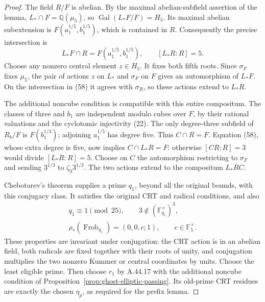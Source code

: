 \begin{proof}
The field \(R/F\) is abelian. By the maximal
abelian-subfield assertion of the lemma,
\(L_*\cap F=\mathbb Q(\mu_5)\), so
\(\operatorname{Gal}(L_*F/F)=H_5\).
Its maximal abelian subextension is
\(F(a_1^{1/5},b_1^{1/5})\), which is contained
in \(R\). Consequently the precise intersection is
\[
 L_*F\cap R=F(a_1^{1/5},b_1^{1/5}),\qquad
                        [L_*R:R]=5.                 \tag{58}
\]
Choose any nonzero central element \(z\in H_5\).
It fixes both fifth roots. Since \(\sigma_F\)
fixes \(\mu_5\), the pair of actions \(z\) on
\(L_*\) and \(\sigma_F\) on \(F\) gives an
automorphism of \(L_*F\). On the intersection
in (58) it agrees with \(\sigma_R\), so these
actions extend to \(L_*R\).

The additional noncube condition is compatible with
this entire compositum. The classes of three and
\(b_1\) are independent modulo cubes over \(F\),
by their rational valuations and the cyclotomic
injectivity (22). The only degree-three subfield
of \(R_b/F\) is \(F(b_1^{1/3})\); adjoining
\(a_1^{1/5}\) has degree five. Thus \(C\cap R=F\).
Equation (58), whose extra degree is five, now
implies \(C\cap L_*R=F\): otherwise
\([CR:R]=3\) would divide \([L_*R:R]=5\).
Choose on \(C\) the automorphism restricting to
\(\sigma_F\) and sending \(3^{1/3}\) to
\(\zeta_3 3^{1/3}\). The two actions extend to
the compositum \(L_*RC\).

Chebotarev's theorem
\cite[Theorem 8.31]{GhostMilneANT} supplies a prime
\(q_1\), beyond all the original bounds, with
this conjugacy class. It satisfies the original
CRT and radical conditions, and also
\[
 \begin{gathered}
 q_1\equiv1\pmod{25},\qquad
 3\notin(\mathbb F_{q_1}^\times)^3,\\
 \rho_*(\operatorname{Frob}_{q_1})=(0,0,c;1),
                         \qquad c\in\mathbb F_5^\times.
 \end{gathered}                                      \tag{59}
\]
These properties are invariant under conjugation:
the CRT action is in an abelian field, both radicals
are fixed together with their roots of unity, and
conjugation multiplies the two nonzero Kummer or
central coordinates by units. Choose the least
eligible prime. Then choose \(r_1\) by A.44.17
with the additional noncube condition of
Proposition~\ref{prop:ghost-elliptic-passing}.
Its old-prime CRT residues are exactly the chosen
\(\eta_p\), as required for the prefix lemma.


\end{proof}
